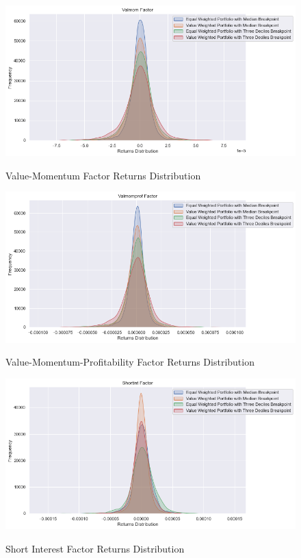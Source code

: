 \begin{figure}[H]
	\caption{Value-Momentum Factor Returns Distribution}
	\centering
	\includegraphics[scale=.63]{../../output/figures/valmom.png}
	\label{fig:valmom}
\end{figure}

\begin{figure}[H]
	\caption{Value-Momentum-Profitability Factor Returns Distribution}
	\centering
	\includegraphics[scale=.63]{../../output/figures/valmomprof.png}
	\label{fig:valmomprof}
\end{figure}

\begin{figure}[H]
	\caption{Short Interest Factor Returns Distribution}
	\centering
	\includegraphics[scale=.63]{../../output/figures/shortint.png}
	\label{fig:shortint}
\end{figure}

